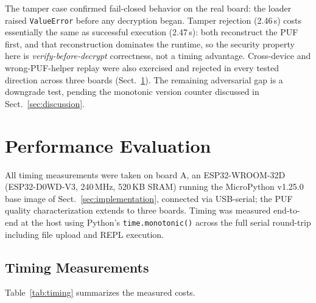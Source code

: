 \documentclass[runningheads]{llncs}
\begin{document}
\noindent The tamper case confirmed fail-closed behavior on the real board: the loader raised \texttt{ValueError} before any decryption began. Tamper rejection (2.46\,s) costs essentially the same as successful execution (2.47\,s): both reconstruct the PUF first, and that reconstruction dominates the runtime, so the security property here is \emph{verify-before-decrypt} correctness, not a timing advantage. Cross-device and wrong-PUF-helper replay were also exercised and rejected in every tested direction across three boards (Sect.~\ref{sec:performance}). The remaining adversarial gap is a downgrade test, pending the monotonic version counter discussed in Sect.~\ref{sec:discussion}.


\section{Performance Evaluation}
\label{sec:performance}

All timing measurements were taken on board A, an ESP32-WROOM-32D (ESP32-D0WD-V3, 240\,MHz, 520\,KB SRAM) running the MicroPython v1.25.0 base image of Sect.~\ref{sec:implementation}, connected via USB-serial; the PUF quality characterization extends to three boards. Timing was measured end-to-end at the host using Python's \texttt{time.monotonic()} across the full serial round-trip including file upload and REPL execution.

\subsection{Timing Measurements}

Table~\ref{tab:timing} summarizes the measured costs.
\end{document}

